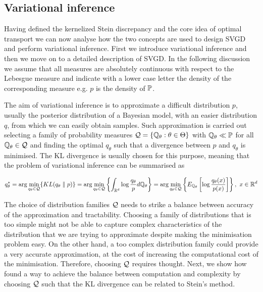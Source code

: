  
\subsection{Variational inference}
Having defined the kernelized Stein discrepancy and the core idea of optimal transport we can now analyse how the two concepts are used to design SVGD and perform variational inference. First we introduce variational inference and then we move on to a detailed description of SVGD. In the following discussion we assume that all measures are absolutely continuous with respect to the Lebesgue measure and indicate with a lower case letter the density of the corresponding measure e.g. $p$ is the density of $\mathbb{P}$.

The aim of variational inference is to approximate a difficult distribution $p$, usually the posterior distribution of a Bayesian model, with an easier distribution $q$, from which we can easily obtain samples. Such approximation is carried out selecting a family of probability measures $\mathcal{Q} = \{\mathbb{Q}_{\theta}: \theta \in \Theta\}$ with $\mathbb{Q}_{\theta} \ll \mathbb{P}$ for all $\mathbb{Q}_{\theta} \in \mathcal{Q}$ and finding the optimal $q_{\theta}$ such that a divergence between $p$ and $q_{\theta}$ is minimised. The KL divergence is usually chosen for this purpose, meaning that the problem of variational inference can be summarised as

\begin{equation}\label{KL}
q_{\theta}^* = \arg\min_{q_{\theta} \in \mathcal{Q}}\{KL(q_{\theta}\parallel p)\} = \arg \min_{q_{\theta} \in \mathcal{Q}} \left\{\int_{\mathbb{R}^d} \log \frac{q_{\theta}}{p}d\mathbb{Q}_{\theta} 	\right\} = \arg \min_{q_{\theta} \in \mathcal{Q}} \left\{E_{\mathbb{Q}_{\theta}}\left[\log \frac{q_{\theta}(x)}{p(x)}\right]	\right\}, \ x \in \mathbb{R}^d
\end{equation}

The choice of distribution families $\mathcal{Q}$ needs to strike a balance between accuracy of the approximation and tractability. Choosing a family of distributions that is too simple might not be able to capture complex characteristics of the distribution that we are trying to approximate despite making the minimisation problem easy. On the other hand, a too complex distribution family could provide a very accurate approximation, at the cost of increasing the computational cost of the minimisation. Therefore, choosing $\mathcal{Q}$ requires thought. Next, we show how \cite{liu2016stein} found a way to achieve the balance between computation and complexity by choosing $\mathcal{Q}$ such that the KL divergence can be related to Stein's method.

